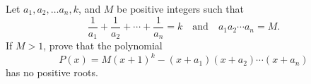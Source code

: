 Let $a_1,a_2,\ldots a_n,k$, and $M$ be positive integers such that
$$\frac{1}{a_1}+\frac{1}{a_2}+\cdots+\frac{1}{a_n}=k\quad\text{and}\quad a_1a_2\cdots a_n=M.$$If $M>1$, prove that the polynomial
$$P(x)=M(x+1)^k-(x+a_1)(x+a_2)\cdots (x+a_n)$$has no positive roots.